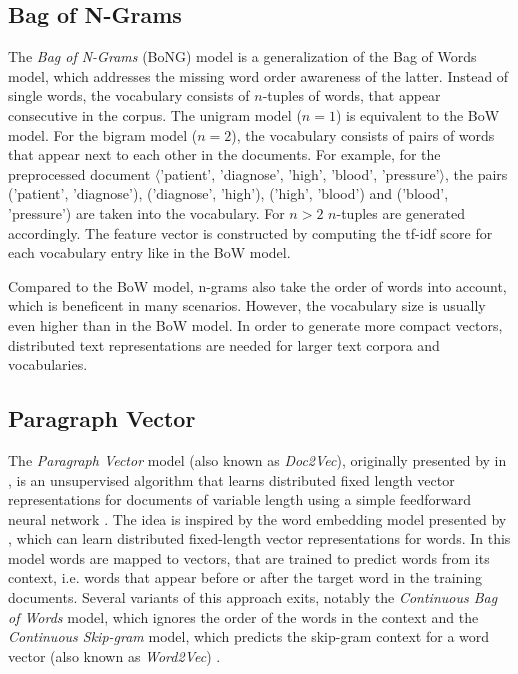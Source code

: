 \subsection{Bag of N-Grams}

The \textit{Bag of N-Grams} (BoNG) model is a generalization of the Bag of Words model, which addresses the missing word order awareness of the latter.
Instead of single words, the vocabulary consists of $n$-tuples of words, that appear consecutive in the corpus.
The unigram model ($n=1$) is equivalent to the BoW model.
For the bigram model ($n=2$), the vocabulary consists of pairs of words that appear next to each other in the documents.
For example, for the preprocessed document $\langle$'patient', 'diagnose', 'high', 'blood', 'pressure'$\rangle$, the pairs ('patient', 'diagnose'), ('diagnose', 'high'), ('high', 'blood') and ('blood', 'pressure') are taken into the vocabulary.
For $n>2$ $n$-tuples are generated accordingly.
The feature vector is constructed by computing the tf-idf score for each vocabulary entry like in the BoW model.

Compared to the BoW model, n-grams also take the order of words into account, which is beneficent in many scenarios.
However, the vocabulary size is usually even higher than in the BoW model.
In order to generate more compact vectors, distributed text representations are needed for larger text corpora and vocabularies.

\subsection{Paragraph Vector}

The \textit{Paragraph Vector} model (also known as \textit{Doc2Vec}), originally presented by \citeauthor{DBLP:conf/icml/LeM14} in \citeyear{DBLP:conf/icml/LeM14}, is an unsupervised algorithm that learns distributed fixed length vector representations for documents of variable length using a simple feedforward neural network \cite{DBLP:conf/icml/LeM14}.
The idea is inspired by the word embedding model presented by \citeauthor{DBLP:journals/jmlr/BengioDVJ03} \cite{DBLP:journals/jmlr/BengioDVJ03}, which can learn distributed fixed-length vector representations for words.
In this model words are mapped to vectors, that are trained to predict words from its context, i.e. words that appear before or after the target word in the training documents.
Several variants of this approach exits, notably the \textit{Continuous Bag of Words} model, which ignores the order of the words in the context and the \textit{Continuous Skip-gram} model, which predicts the skip-gram context for a word vector (also known as \textit{Word2Vec}) \cite{DBLP:journals/corr/abs-1301-3781}.

